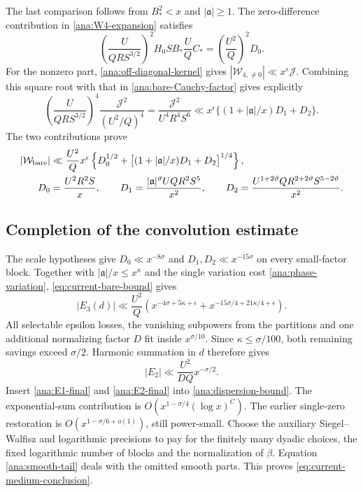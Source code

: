 The last comparison follows from $B_*^2<x$ and $|\mathfrak a|\ge1$.
The zero-difference contribution in \eqref{ana:W4-expansion}
satisfies
\[
 \left(\frac{U}{QRS^{3/2}}\right)^2H_0SB_*\frac UQ C_*
       =\left(\frac{U^2}{Q}\right)^2D_0.
\]
For the nonzero part, \eqref{ana:off-diagonal-kernel} gives
$|\mathcal W_{4,\ne0}|\ll x^\epsilon\mathcal J$.
Combining this square root with that in
\eqref{ana:bare-Cauchy-factor} gives explicitly
\[
 \left(\frac{U}{QRS^{3/2}}\right)^4
 \frac{\mathcal J^2}{(U^2/Q)^4}
 =\frac{\mathcal J^2}{U^4R^4S^6}
 \ll x^\epsilon\bigl\{(1+|\mathfrak a|/x)D_1+D_2\bigr\}.
\]
The two contributions prove
\begin{align}
 |\mathcal W_{\rm bare}|&\ll\frac{U^2}{Q}x^\epsilon
   \left\{D_0^{1/2}
    +\bigl[(1+|\mathfrak{a}|/x)D_1+D_2\bigr]^{1/4}\right\},
 \label{eq:current-bare-bound}\\
 D_0&=\frac{U^2R^2S}{x},\qquad
 D_1=\frac{|\mathfrak{a}|^\vartheta UQR^2S^5}{x^2},\qquad
 D_2=\frac{U^{1+2\vartheta}QR^{2+2\vartheta}S^{5-2\vartheta}}{x^2}.
 \notag
\end{align}

\subsection{Completion of the convolution estimate}

The scale hypotheses give $D_0\ll x^{-8\sigma}$ and
$D_1,D_2\ll x^{-15\sigma}$ on every small-factor block.
Together with $|\mathfrak{a}|/x\le x^\kappa$ and the single variation cost
\eqref{ana:phase-variation}, \eqref{eq:current-bare-bound} gives
\[
 |E_3(d)|\ll\frac{U^2}{Q}
 \left(x^{-4\sigma+5\kappa+\epsilon}
       +x^{-15\sigma/4+21\kappa/4+\epsilon}\right).
\]
All selectable epsilon losses, the vanishing subpowers from the
partitions and one additional normalizing factor $D$ fit inside
$x^{\sigma/10}$. Since $\kappa\le\sigma/100$, both remaining
savings exceed $\sigma/2$. Harmonic summation in $d$ therefore gives
\begin{equation}
 |E_2|\ll\frac{U^2}{DQ}x^{-\sigma/2}.
 \label{ana:E2-final}
\end{equation}
Insert \eqref{ana:E1-final} and \eqref{ana:E2-final} into
\eqref{ana:dispersion-bound}. The exponential-sum contribution is
$O(x^{1-\sigma/4}(\log x)^C)$. The earlier single-zero restoration
is $O(x^{1-\sigma/6+o(1)})$, still power-small.
Choose the auxiliary Siegel--Walfisz and logarithmic precisions to
pay for the finitely many dyadic choices, the fixed logarithmic number
of blocks and the normalization of $\beta$. Equation
\eqref{ana:smooth-tail} deals with the omitted smooth parts.
This proves \eqref{eq:current-medium-conclusion}.

